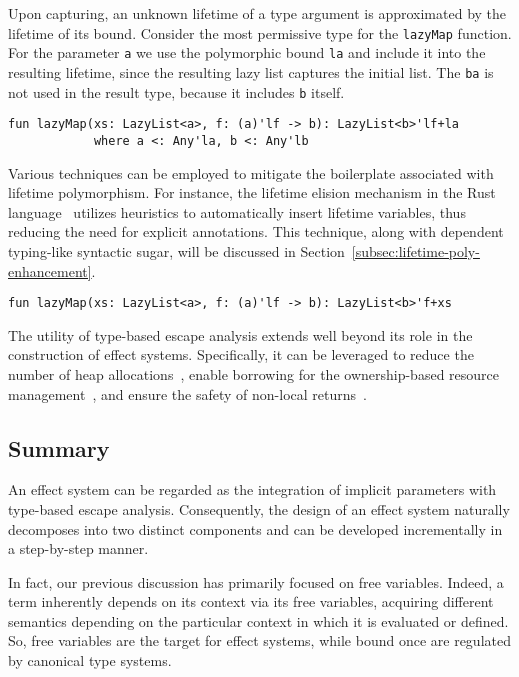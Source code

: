 \documentclass[acmsmall,review,screen]{acmart}
\begin{document}
Upon capturing, an unknown lifetime of a type argument is approximated by the lifetime of its bound.
Consider the most permissive type for the \lstinline[language=colang]|lazyMap| function.
For the parameter \lstinline[language=colang]|a| we use the polymorphic bound \lstinline[language=colang]|la| and include it into the resulting lifetime, since the resulting lazy list captures the initial list.
The \lstinline[language=colang]|ba| is not used in the result type, because it includes \lstinline[language=colang]|b| itself.
\begin{lstlisting}[language=colang]
    fun lazyMap(xs: LazyList<a>, f: (a)'lf -> b): LazyList<b>'lf+la
            where a <: Any'la, b <: Any'lb
\end{lstlisting}

Various techniques can be employed to mitigate the boilerplate associated with lifetime polymorphism.
For instance, the lifetime elision mechanism in the Rust language~\cite{matsakis2014rust} utilizes heuristics to automatically insert lifetime variables, thus reducing the need for explicit annotations.
This technique, along with dependent typing-like syntactic sugar, will be discussed in Section~\ref{subsec:lifetime-poly-enhancement}.
\begin{lstlisting}[language=colang]
    fun lazyMap(xs: LazyList<a>, f: (a)'lf -> b): LazyList<b>'f+xs
\end{lstlisting}

The utility of type-based escape analysis extends well beyond its role in the construction of effect systems.
Specifically, it can be leveraged to reduce the number of heap allocations~\cite{lorenzen2024oxidizing}, enable borrowing for the ownership-based resource management~\cite{matsakis2014rust, lorenzen2024oxidizing}, and ensure the safety of non-local returns~\cite{akhin2021kotlin}.

\subsection{Summary} \label{subsec:idea-summary}

An effect system can be regarded as the integration of implicit parameters with type-based escape analysis.
Consequently, the design of an effect system naturally decomposes into two distinct components and can be developed incrementally in a step-by-step manner.

In fact, our previous discussion has primarily focused on free variables.
Indeed, a term inherently depends on its context via its free variables, acquiring different semantics depending on the particular context in which it is evaluated or defined.
So, free variables are the target for effect systems, while bound once are regulated by canonical type systems.
\end{document}
